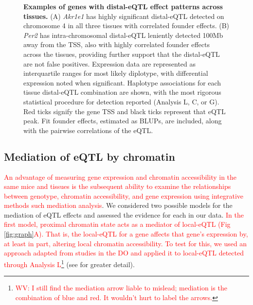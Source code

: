 \documentclass[10pt,letterpaper]{article}
\newcommand{\WV}[2]{\textcolor{red}{#1\footnote{\textcolor{red}{WV: #2}}}}
\newcommand{\WVinline}[1]{\textcolor{red}{#1}}
\begin{document}
\begin{figure}[h!]
\caption{\textbf{Examples of genes with distal-eQTL effect patterns across tissues.} 
(A) \textit{Akr1e1} has highly significant distal-eQTL detected on chromosome 4 in all three tissues with correlated founder effects. (B) \textit{Per2} has intra-chromosomal distal-eQTL leniently detected 100Mb away from the TSS, also with highly correlated founder effects across the tissues, providing further support that the distal-eQTL are not false positives. 
Expression data are represented as interquartile ranges for most likely diplotype, with differential expression noted when significant. Haplotype associations for each tissue distal-eQTL combination are shown, with the most rigorous statistical procedure for detection reported (Analysis L, C, or G). Red ticks signify the gene TSS and black ticks represent that eQTL peak. Fit founder effects, estimated as BLUPs, are included, along with the pairwise correlations of the eQTL. 
\label{fig:correlated_distal_eqtl}}
\end{figure}

\subsection*{Mediation of eQTL by chromatin}

\WVinline{An advantage of measuring gene expression and chromatin accessibility in the same mice and tissues is the subsequent ability to examine the relationships between genotype, chromatin accessibility, and gene expression using integrative methods such mediation analysis}.
We considered two possible models for the mediation of eQTL effects and assessed the evidence for each in our data.
\WVinline{In the first model, proximal chromatin state acts as a mediator of local-eQTL (Fig \ref{fig:graph}A). That is, the local-eQTL for a gene affects that gene's expression by, at least in part, altering local chromatin accessibility. To test for this, we used an approach adapted from studies in the DO \cite{Chick2016} and applied it to local-eQTL detected through Analysis L}\WV{}{I still find the mediation arrow liable to mislead; mediation is the combination of blue and red. It wouldn't hurt to label the arrows.} (see  for greater detail). 
\end{document}
